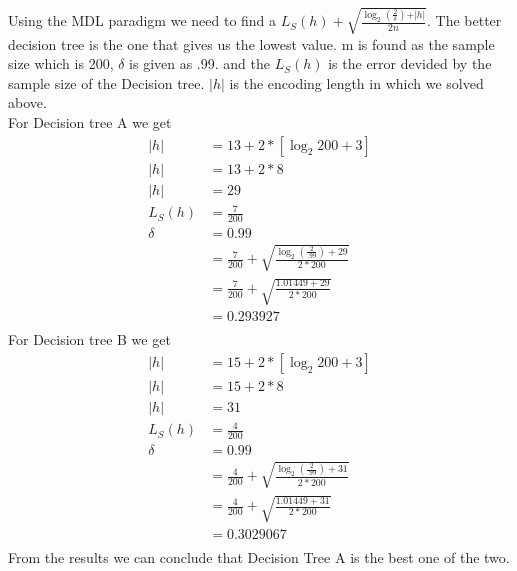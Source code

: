 \documentclass[12pt,english]{article}
\begin{document}
Using the MDL paradigm we need to find a $L_S(h) + \sqrt{\frac{\log_{ 2}{\left( \frac{2}{\delta} \right) } + \vert h \vert }{2 n}}$. The better decision tree is the one that gives us the lowest value. m is found as the sample size which is 200, $\delta$ is given as .99. and the $L_S(h)$ is the error devided by the sample size of the Decision tree. $|h|$ is the encoding length in which we solved above.\\
For Decision tree A we get
\begin{equation}\tag{a}\label{eq:c}
\begin{split}
|h|  &= 13 + 2 * \left [ \log_{2}200 + 3 \right]\\
|h|  &= 13 + 2 * 8\\
|h|  &= 29\\
L_S(h) &= \frac{7}{200}\\
\delta &= 0.99\\
&=\frac{7}{200} + \sqrt{\frac{\log_{2}{\left( \frac{2}{.99} \right) } + 29 }{2 *200}}\\
&=\frac{7}{200} + \sqrt{\frac{1.01449 + 29 }{2 *200}}\\
&=0.293927\\
\end{split}
\end{equation}
For Decision tree B we get
\begin{equation}\tag{b}\label{eq:d}
\begin{split}
|h|  &= 15 + 2 * \left [ \log_{2}200 + 3 \right]\\
|h|  &= 15 + 2 * 8\\
|h|  &= 31\\
L_S(h) &= \frac{4}{200}\\
\delta &= 0.99\\
&=\frac{4}{200} + \sqrt{\frac{\log_{2}{\left( \frac{2}{.99} \right) } + 31 }{2 *200}}\\
&=\frac{4}{200} + \sqrt{\frac{1.01449 + 31 }{2 *200}}\\
&=0.3029067\\
\end{split}
\end{equation}
From the results we can conclude that Decision Tree A is the best one of the two.
\end{document}
